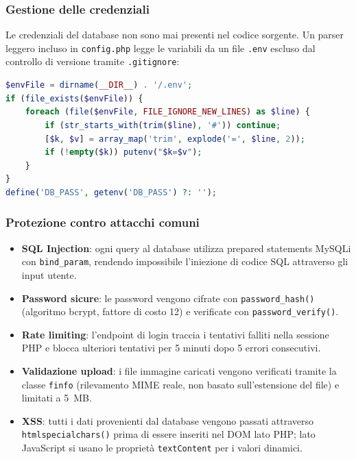 \documentclass[12pt, a4paper]{article}
\begin{document}
\subsubsection{Gestione delle credenziali}

Le credenziali del database non sono mai presenti nel codice sorgente. Un
parser leggero incluso in \texttt{config.php} legge le variabili da un
file \texttt{.env} escluso dal controllo di versione tramite \texttt{.gitignore}:

\begin{lstlisting}[language=PHP, caption={Caricamento sicuro delle variabili d'ambiente.}]
$envFile = dirname(__DIR__) . '/.env';
if (file_exists($envFile)) {
    foreach (file($envFile, FILE_IGNORE_NEW_LINES) as $line) {
        if (str_starts_with(trim($line), '#')) continue;
        [$k, $v] = array_map('trim', explode('=', $line, 2));
        if (!empty($k)) putenv("$k=$v");
    }
}
define('DB_PASS', getenv('DB_PASS') ?: '');
\end{lstlisting}

\subsubsection{Protezione contro attacchi comuni}

\begin{itemize}
    \item \textbf{SQL Injection}: ogni query al database utilizza prepared
    statements MySQLi con \texttt{bind\_param}, rendendo impossibile
    l'iniezione di codice SQL attraverso gli input utente.

    \item \textbf{Password sicure}: le password vengono cifrate con
    \texttt{password\_hash()} (algoritmo bcrypt, fattore di costo 12)
    e verificate con \texttt{password\_verify()}.

    \item \textbf{Rate limiting}: l'endpoint di login traccia i tentativi
    falliti nella sessione PHP e blocca ulteriori tentativi per 5 minuti
    dopo 5 errori consecutivi.

    \item \textbf{Validazione upload}: i file immagine caricati vengono
    verificati tramite la classe \texttt{finfo} (rilevamento MIME reale,
    non basato sull'estensione del file) e limitati a 5~MB.

    \item \textbf{XSS}: tutti i dati provenienti dal database vengono
    passati attraverso \texttt{htmlspecialchars()} prima di essere
    inseriti nel DOM lato PHP; lato JavaScript si usano le proprietà
    \texttt{textContent} per i valori dinamici.
\end{itemize}
\end{document}
